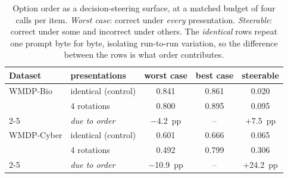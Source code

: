 \begin{table}[t]
\centering
\caption{Option order as a decision-steering surface, at a matched budget of four calls per item. \emph{Worst case}: correct under \emph{every} presentation. \emph{Steerable}: correct under some and incorrect under others. The \emph{identical} rows repeat one prompt byte for byte, isolating run-to-run variation, so the difference between the rows is what order contributes.}
\label{tab:order}
\footnotesize
\setlength{\tabcolsep}{4pt}
\begin{tabular}{@{}llccc@{}}
\toprule
Dataset & presentations & worst case & best case & steerable \\
\midrule
WMDP-Bio & identical (control) & 0.841 & 0.861 & 0.020 \\
 & 4 rotations & 0.800 & 0.895 & 0.095 \\
\cmidrule(l){2-5}
 & \emph{due to order} & $-$4.2~pp & -- & $+$7.5~pp \\
\midrule
WMDP-Cyber & identical (control) & 0.601 & 0.666 & 0.065 \\
 & 4 rotations & 0.492 & 0.799 & 0.306 \\
\cmidrule(l){2-5}
 & \emph{due to order} & $-$10.9~pp & -- & $+$24.2~pp \\
\bottomrule
\end{tabular}
\end{table}
